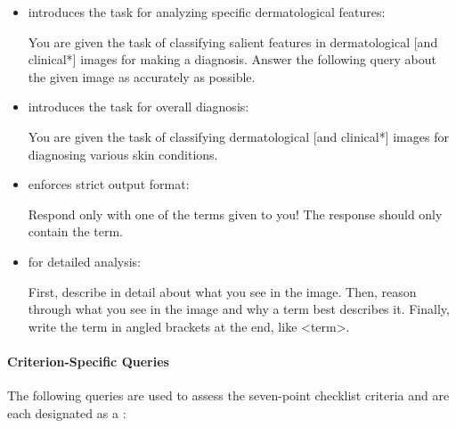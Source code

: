 \documentclass[../ShajiS_RnDReport.tex]{subfiles}
\begin{document}
\begin{itemize}
    \item {} introduces the task for analyzing specific dermatological features:
    \begin{promptbox}
    You are given the task of classifying salient features in dermatological [and clinical*] images for making a diagnosis. 
    Answer the following query about the given image as accurately as possible.
    \end{promptbox}

    \item {} introduces the task for overall diagnosis:
    \begin{promptbox}
    You are given the task of classifying dermatological [and clinical*] images for diagnosing various skin conditions.
    \end{promptbox}

    \item {} enforces strict output format:
    \begin{promptbox}
    Respond only with one of the terms given to you! The response should only contain the term.
    \end{promptbox}

    \item {} for detailed analysis:
    \begin{promptbox}
    First, describe in detail about what you see in the image. Then, reason through what you see in the image and why a term best describes it. Finally, write the term in angled brackets at the end, like <term>.
    \end{promptbox}
\end{itemize}

\paragraph{Criterion-Specific Queries}
\label{sec:appendix:prompts:derm:criterion}
The following queries are used to assess the seven-point checklist criteria and are each designated as a :
\end{document}
